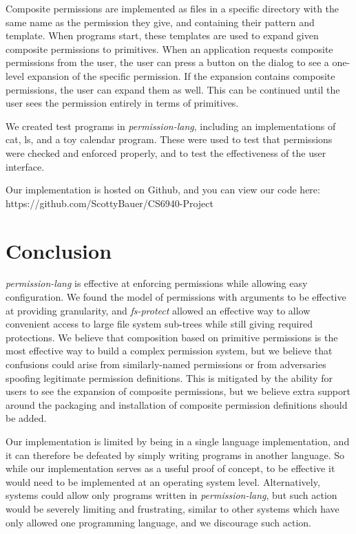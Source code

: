 Composite permissions are implemented as files in a specific directory with the same name as the permission they give, and containing their pattern and template.  When programs start, these templates are used to expand given composite permissions to primitives.  When an application requests composite permissions from the user, the user can press a button on the dialog to see a one-level expansion of the specific permission.  If the expansion contains composite permissions, the user can expand them as well.  This can be continued until the user sees the permission entirely in terms of primitives.

We created test programs in \textit{permission-lang}, including an implementations of cat, ls, and a toy calendar program.
These were used to test that permissions were checked and enforced properly, and to test the effectiveness of the user interface.

Our implementation is hosted on Github, and you can view our code here: https://github.com/ScottyBauer/CS6940-Project

\section{Conclusion}\label{section:conclusion}
\textit{permission-lang} is effective at enforcing permissions while allowing easy configuration.  We found the model of permissions with arguments to be effective at providing granularity, and \textit{fs-protect} allowed an effective way to allow convenient access to large file system sub-trees while still giving required protections.
We believe that composition based on primitive permissions is the most effective way to build a complex permission system, but we believe that confusions could arise from similarly-named permissions or from adversaries spoofing legitimate permission definitions.  This is mitigated by the ability for users to see the expansion of composite permissions, but we believe extra support around the packaging and installation of composite permission definitions should be added.

Our implementation is limited by being in a single language implementation, and it can therefore be defeated by simply writing programs in another language.  So while our implementation serves as a useful proof of concept, to be effective it would need to be implemented at an operating system level.  Alternatively, systems could allow only programs written in \textit{permission-lang}, but such action would be severely limiting and frustrating, similar to other systems which have only allowed one programming language, and we discourage such action.  

